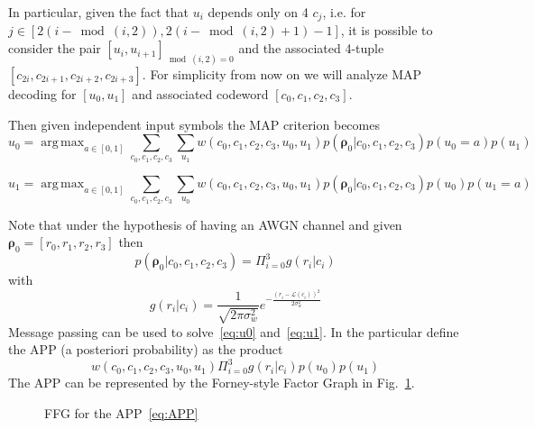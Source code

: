 \documentclass[10pt]{article}
\DeclareMathOperator*{\argmax}{arg\,max}
\begin{document}
In particular, given the fact that $u_i$ depends only on 4 $c_j$, i.e. for $j \in [2(i-\bmod(i,2)), 2(i-\bmod(i,2) + 1) - 1]$, it is possible to consider the pair $[u_i, u_{i+1}]_{\bmod(i,2) = 0}$ and the associated 4-tuple $[c_{2i}, c_{2i+1}, c_{2i+2}, c_{2i+3}]$. 
For simplicity from now on we will analyze MAP decoding for $[u_0, u_1]$ and associated codeword $[c_0, c_1, c_2, c_3]$. 

Then given independent input symbols the MAP criterion becomes
\begin{equation}\label{eq:u0}
	\hat{u}_0 = \argmax_{a \in [0,1]} \sum_{c_0, c_1, c_2, c_3} \sum_{u_1} w(c_0, c_1, c_2, c_3, u_0, u_1) p(\boldsymbol{\rho}_0 | c_0, c_1, c_2, c_3) p(u_0 = a) p(u_1)
\end{equation}

\begin{equation}\label{eq:u1}
	\hat{u}_1 = \argmax_{a \in [0,1]} \sum_{c_0, c_1, c_2, c_3} \sum_{u_0} w(c_0, c_1, c_2, c_3, u_0, u_1) p(\boldsymbol{\rho}_0 | c_0, c_1, c_2, c_3) p(u_0) p(u_1 = a) 
\end{equation}

Note that under the hypothesis of having an AWGN channel and given $\boldsymbol{\rho}_0 = [r_0, r_1, r_2, r_3]$ then
\begin{equation}
	p(\boldsymbol{\rho}_0 | c_0, c_1, c_2, c_3) = \Pi_{i = 0}^{3} g(r_i | c_i)
\end{equation}
with
\begin{equation}
	g(r_i|c_i) = \frac{1}{\sqrt{2\pi \sigma_w^2}} e^{-\frac{(r_i - \mathcal{L}(c_i))^2}{2\sigma_w^2}}
\end{equation}
Message passing can be used to solve~\eqref{eq:u0} and~\eqref{eq:u1}. In the particular define the APP (a posteriori probability) as the product
\begin{equation}\label{eq:APP}
	w(c_0, c_1, c_2, c_3, u_0, u_1) \Pi_{i = 0}^{3} g(r_i | c_i)p(u_0) p(u_1) 
\end{equation}
The APP can be represented by the Forney-style Factor Graph in Fig.~\ref{fig:FFG}.

\begin{figure}[h]
\centering
{}
\caption{FFG for the APP~\eqref{eq:APP}}
\label{fig:FFG}
\end{figure}
\end{document}
